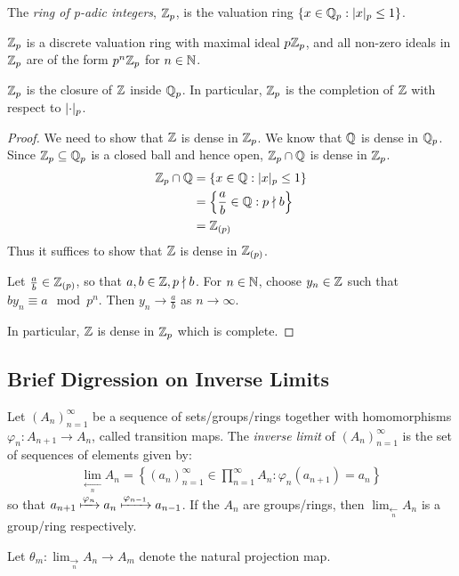 \documentclass[10pt,a4paper]{article}
\begin{document}
\begin{definition}
  The \emph{ring of p-adic integers}, $\mathbb{Z}_p$, is the valuation ring $\{x \in \mathbb{Q}_p : \lvert x\rvert_p \leq 1\}$.
\end{definition}
$\mathbb{Z}_p$ is a discrete valuation ring with maximal ideal $p\mathbb{Z}_p$, and all non-zero ideals in $\mathbb{Z}_p$ are of the form $p^n \mathbb{Z}_p$ for $n \in \mathbb{N}$.

\begin{proposition}
  $\mathbb{Z}_p$ is the closure of $\mathbb{Z}$ inside $\mathbb{Q}_p$. In particular, $\mathbb{Z}_p$ is the completion of $\mathbb{Z}$ with respect to $\lvert\cdot\rvert_p$.
\end{proposition}
\begin{proof}
  We need to show that $\mathbb{Z}$ is dense in $\mathbb{Z}_p$. We know that $\mathbb{Q}$ is dense in $\mathbb{Q}_p$. Since $\mathbb{Z}_p \subseteq \mathbb{Q}_p$ is a closed ball and hence open, $\mathbb{Z}_p \cap \mathbb{Q}$ is dense in $\mathbb{Z}_p$.
  \begin{align*}
    \mathbb{Z}_p \cap \mathbb{Q} &= \{x \in \mathbb{Q} : \lvert x\rvert_p \leq 1\}\\
    &= \left\{\frac{a}{b} \in \mathbb{Q} : p \nmid b\right\}\\
    &= \mathbb{Z}_{(p)}
  \end{align*}
  Thus it suffices to show that $\mathbb{Z}$ is dense in $\mathbb{Z}_{(p)}$.

  Let $\frac{a}{b} \in \mathbb{Z}_{(p)}$, so that $a, b \in \mathbb{Z}, p\nmid b$. For $n \in \mathbb{N}$, choose $y_n\in\mathbb{Z}$ such that $by_n \equiv a \mod p^n$. Then $y_n \to \frac{a}{b}$ as $n \to \infty$.

  In particular, $\mathbb{Z}$ is dense in $\mathbb{Z}_p$ which is complete.
\end{proof}

\subsection{Brief Digression on Inverse Limits}
Let $(A_n)_{n=1}^\infty$ be a sequence of sets/groups/rings together with homomorphisms $\varphi_n : A_{n+1} \to A_n$, called transition maps. The \emph{inverse limit} of $(A_n)_{n=1}^\infty$ is the set of sequences of elements given by:
\begin{align*}
  \lim_{\xleftarrow[n]{}} A_n = \left\{(a_n)_{n=1}^\infty \in \prod_{n=1}^\infty A_n : \varphi_n(a_{n+1}) = a_n\right\}
\end{align*}
so that $a_{n+1} \xmapsto{\varphi_{n}} a_n \xmapsto{\varphi_{n-1}} a_{n-1}$. If the $A_n$ are groups/rings, then $\lim_{\xleftarrow[n]{}} A_n$ is a group/ring respectively.

Let $\theta_m : \lim_{\xrightarrow[n]{}}A_n \to A_m$ denote the natural projection map.
\end{document}
